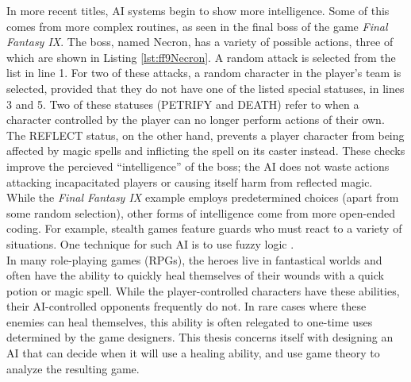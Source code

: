 In more recent titles, AI systems begin to show more intelligence. Some of this comes from more complex routines, as seen in the final boss of the game \textit{Final Fantasy IX}. The boss, named Necron, has a variety of possible actions, three of which are shown in Listing \ref{lst:ff9Necron}. A random attack is selected from the list in line 1. For two of these attacks, a random character in the player's team is selected, provided that they do not have one of the listed special statuses, in lines 3 and 5. Two of these statuses (PETRIFY and DEATH) refer to when a character controlled by the player can no longer perform actions of their own. The REFLECT status, on the other hand, prevents a player character from being affected by magic spells and inflicting the spell on its caster instead. These checks improve the percieved ``intelligence'' of the boss; the AI does not waste actions attacking incapacitated players or causing itself harm from reflected magic.\\

While the \textit{Final Fantasy IX} example employs predetermined choices (apart from some random selection), other forms of intelligence come from more open-ended coding. For example, stealth games feature guards who must react to a variety of situations. One technique for such AI is to use fuzzy logic \cite{schw04}.\\

In many role-playing games (RPGs), the heroes live in fantastical worlds and often have the ability to quickly heal themselves of their wounds with a quick potion or magic spell. While the player-controlled characters have these abilities, their AI-controlled opponents frequently do not. In rare cases where these enemies can heal themselves, this ability is often relegated to one-time uses determined by the game designers. This thesis concerns itself with designing an AI that can decide when it will use a healing ability, and use game theory to analyze the resulting game.